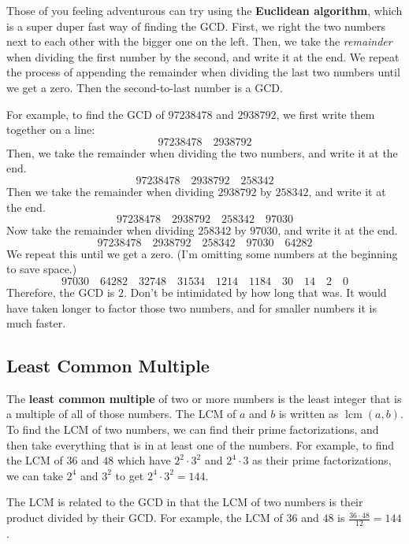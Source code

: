 \documentclass{article}
\DeclareMathOperator{\lcm}{lcm}
\begin{document}
\begin{multicols}{2}
	Those of you feeling adventurous can try using the \textbf{Euclidean algorithm},
	which is a super duper fast way of finding the GCD.
	First, we right the two numbers next to each other with the bigger one on the left.
	Then, we take the \emph{remainder} when dividing the first number by the second,
	and write it at the end.
	We repeat the process of appending the remainder when dividing the last two numbers
	until we get a zero.
	Then the second-to-last number is a GCD.
	
	For example, to find the GCD of $97238478$ and $2938792$,
	we first write them together on a line:
	\[97238478 \quad 2938792\]
	Then, we take the remainder when dividing the two numbers, and write it at the end.
	\[97238478 \quad 2938792 \quad 258342\]
	Then we take the remainder when dividing $2938792$ by $258342$, and write it at the end.
	\[97238478 \quad 2938792 \quad 258342 \quad 97030\]
	Now take the remainder when dividing $258342$ by $97030$, and write it at the end.
	\[97238478 \quad 2938792 \quad 258342 \quad 97030 \quad 64282\]
	We repeat this until we get a zero.
	(I'm omitting some numbers at the beginning to save space.)
	\[97030 \quad 64282 \quad 32748 \quad 31534 \quad 1214 \quad 1184 \quad 30 \quad 14 \quad 2
	\quad 0\]
	Therefore, the GCD is $2$.
	Don't be intimidated by how long that was.
	It would have taken longer to factor those two numbers,
	and for smaller numbers it is much faster.
	
	\subsection*{Least Common Multiple}
	The \textbf{least common multiple} of two or more numbers is the least integer that
	is a multiple of all of those numbers.
	The LCM of $a$ and $b$ is written as $\lcm(a, b)$.
	To find the LCM of two numbers, we can find their prime factorizations, and then take everything
	that is in at least one of the numbers.
	For example, to find the LCM of $36$ and $48$ which have $2^2 \cdot 3^2$ and $2^4 \cdot 3$
	as their prime factorizations, we can take $2^4$ and $3^2$ to get $2^4 \cdot 3^2 = 144$.
	
	The LCM is related to the GCD in that the LCM of two numbers is their product divided by
	their GCD.
	For example, the LCM of $36$ and $48$ is $\frac{36 \cdot 48}{12} = 144$.
	

\end{multicols}
\end{document}

